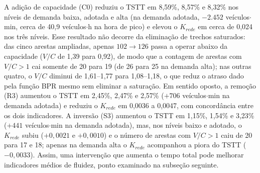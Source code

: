 \documentclass[portuguese]{sbc2025}%
\begin{document}
\begin{table}[htbp]
\caption{Impacto das três intervenções em relação à situação atual no mesmo nível de demanda ($a=0{,}15$; $b=4$)}
\label{tab:intervencoes}
\centering
{}
\end{table}

A adição de capacidade (C0) reduziu o TSTT em 8,59\%, 8,57\% e 8,32\% nos níveis de demanda baixa, adotada e alta (na demanda adotada, $-2.452$ veículos$\cdot$min, cerca de 40,9 veículos$\cdot$h na hora de pico) e elevou o $K_{rede}$ em cerca de 0,024 nos três níveis. Esse resultado não decorre da eliminação de trechos saturados: das cinco arestas ampliadas, apenas $102\rightarrow126$ passa a operar abaixo da capacidade ($V/C$ de 1,39 para 0,92), de modo que a contagem de arestas com $V/C>1$ cai somente de 20 para 19 (de 26 para 25 na demanda alta); nas outras quatro, o $V/C$ diminui de 1,61--1,77 para 1,08--1,18, o que reduz o atraso dado pela função BPR mesmo sem eliminar a saturação. Em sentido oposto, a remoção (R3) aumentou o TSTT em 2,45\%, 2,47\% e 2,57\% ($+706$ veículos$\cdot$min na demanda adotada) e reduziu o $K_{rede}$ em 0,0036 a 0,0047, com concordância entre os dois indicadores. A inversão (S3) aumentou o TSTT em 1,15\%, 1,54\% e 3,23\% ($+441$ veículos$\cdot$min na demanda adotada), mas, nos níveis baixo e adotado, o $K_{rede}$ subiu ($+0{,}0021$ e $+0{,}0010$) e o número de arestas com $V/C>1$ caiu de 20 para 17 e 18; apenas na demanda alta o $K_{rede}$ acompanhou a piora do TSTT ($-0{,}0033$). Assim, uma intervenção que aumenta o tempo total pode melhorar indicadores médios de fluidez, ponto examinado na subseção seguinte.
\end{document}
